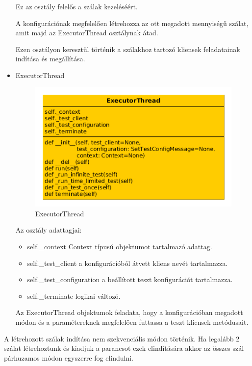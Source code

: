 \documentclass[a4paper,12pt,oneside]{report}
\begin{document}
\begin{itemize}
Ez az osztály felelős a szálak kezeléséért.

A konfigurációnak megfelelően létrehozza az ott megadott mennyiségű szálat, amit majd az ExecutorThread osztálynak átad.

Ezen osztályon keresztül történik a szálakhoz tartozó kliensek feladatainak indítása és megállítása.

		\item ExecutorThread
			\begin{figure}[h]
				  \includegraphics[width=13cm,keepaspectratio]{executorthread.png}
					  \caption{ExecutorThread}
				  \label{fig:executorthread}
			\end{figure}

	Az osztály adattagjai:
	
		\begin{itemize}
			\itemsep0em
				\item self.\_context Context típusú objektumot tartalmazó adattag.
				\item self.\_test\_client a konfigurációból átvett kliens nevét tartalmazza.
				\item self.\_test\_configuration a beállított teszt konfigurációt tartalmazza.
				\item self.\_terminate logikai változó.
		\end{itemize}
		
		Az ExecutorThread objektumok feladata, hogy a konfigurációban megadott módon és a paramétereknek megfelelően futtassa a teszt kliensek metódusait.
\end{itemize}

A létrehozott szálak indítása nem szekvenciális módon történik.
Ha legalább 2 szálat létrehoztunk és kiadjuk a parancsot ezek elindítására akkor az összes szál párhuzamos módon egyszerre fog elindulni.
        
\end{document}
